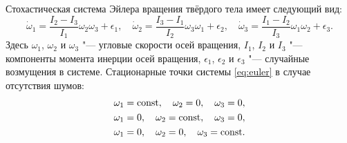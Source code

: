 \smallskip

 Стохастическая система Эйлера вращения твёрдого тела имеет
следующий вид:
\begin{equation}
\dot{\omega}_{1}= \frac {I_2-I_3}{I_1} \omega_2 \omega_3 + \epsilon_1,
\quad 
\dot{\omega}_{2}= \frac {I_3-I_1}{I_2} \omega_3 \omega_1 + \epsilon_2,
\quad 
\dot{\omega}_{3}= \frac {I_1-I_2}{I_3} \omega_1 \omega_2 + \epsilon_3. \label{eq:euler}
\end{equation}
Здесь $\omega_1$, $\omega_2$ и $\omega_3$ "--- угловые скорости
осей вращения, $I_1$, $I_2$ и $I_3$ "--- компоненты момента инерции
осей вращения, $\epsilon_1$, $\epsilon_2$ и $\epsilon_3$ "---
случайные возмущения в системе. 
Стационарные точки системы \eqref{eq:euler} в случае отсутствия шумов:
\begin{gather}
\omega_1={\rm const},\quad \omega_2=0, \quad \omega_3=0,  \\
\omega_1=0, \quad \omega_2={\rm const}, \quad \omega_3=0,\\
\omega_1=0, \quad \omega_2=0, \quad \omega_3= \rm const.
\end{gather}

